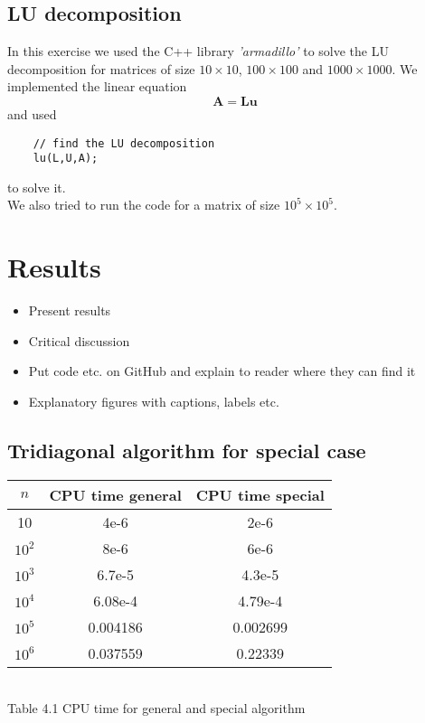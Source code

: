 \documentclass[12pt]{article}
\renewcommand{\vec}[1]{\mathbf{#1}}
\begin{document}
\subsection{LU decomposition}

\noindent In this exercise we used the C++ library \textit{'armadillo'} to solve the LU decomposition for matrices of size $10 \times 10$, $100 \times 100$ and $1000 \times 1000$. We implemented the linear equation $$\vec{A} = \vec{L} \vec{u}$$ and used
\begin{lstlisting}
    // find the LU decomposition
    lu(L,U,A);
\end{lstlisting}
to solve it.\\
\bigskip
\noindent We also tried to run the code for a matrix of size $10^5 \times 10^5$.


\section{Results}

\begin{itemize}
\item Present results
\item Critical discussion
\item Put code etc. on GitHub and explain to reader where they can find it
\item Explanatory figures with captions, labels etc.
\end{itemize}

\subsection{Tridiagonal algorithm for special case}
\begin{center}
\begin{tabular}{ c | c | c }
	$n$ & CPU time general & CPU time special \\
	\hline
	10 & 4e-6 & 2e-6 \\
	$10^2$ & 8e-6 & 6e-6 \\
	$10^3$ & 6.7e-5 & 4.3e-5 \\
	$10^4$ & 6.08e-4 & 4.79e-4 \\
	$10^5$ & 0.004186 & 0.002699 \\
	$10^6$ & 0.037559 & 0.22339 \\
\end{tabular}
\medskip
\\
Table 4.1 CPU time for general and special algorithm
\end{center}
\end{document}
